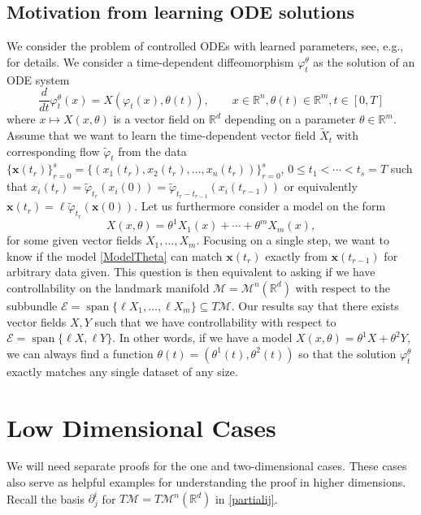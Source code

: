 \documentclass[10pt]{amsart}
\theoremstyle{remark}
\DeclareMathOperator{\spn}{span}
\newcommand{\E}{\mathcal{E}}
\newcommand{\LM}{\mathcal{M}}
\numberwithin{equation}{section}
\begin{document}
\subsection{Motivation from learning ODE solutions} \label{sec:NeuralODE}
We consider the problem of controlled ODEs with learned parameters, see, e.g., \cite{ChenNeurIPS,Ruiz-Balet,ALVAREZLOPEZ2024106640,ChengControl} for details. We consider a time-dependent diffeomorphism $\varphi_{t}^\theta$ as the solution of an ODE system
$$\frac{d}{dt} \varphi_t^\theta(x) = X(\varphi_t(x), \theta(t)), \qquad x \in \mathbb{R}^n, \theta(t) \in \mathbb{R}^m, t \in [0,T]$$
where $x\mapsto X(x,\theta)$ is a vector field on $\mathbb{R}^d$ depending on a parameter $\theta \in \mathbb{R}^m$. Assume that we want to learn the time-dependent vector field $\tilde X_t$ with corresponding flow $\tilde \varphi_t$ from the data $\{ \mathbf{x}(t_r)\}_{r=0}^s = \{ (x_{1}(t_r), x_{2}(t_r) ,\dots, x_{n}(t_r))\}_{r=0}^s$, $0 \leq t_1 < \cdots < t_s =T$ such that $x_{i}(t_r) = \tilde \varphi_{t_r}(x_{i}(0)) = \tilde \varphi_{t_r-t_{r-1}}(x_{i}(t_{r-1}))$ or equivalently $\mathbf{x}(t_r) = \ell \tilde \varphi_{t_r}(\mathbf{x}(0))$. Let us furthermore consider a model on the form
\begin{equation} \label{ModelTheta} X(x, \theta) = \theta^1 X_1(x) + \cdots + \theta^m X_m(x), \end{equation}
for some given vector fields $X_1, \dots, X_m$.
Focusing on a single step, we want to know if the model \eqref{ModelTheta} can match $\mathbf{x}(t_{r})$ exactly from $\mathbf{x}(t_{r-1})$ for arbitrary data given. This question is then equivalent to asking if we have controllability on the landmark manifold $\LM= \LM^n(\mathbb{R}^d)$ with respect to the subbundle $\E = \spn \{ \ell X_1, \dots, \ell X_m \} \subseteq T\LM$. Our results say that there exists vector fields $X, Y$ such that we have controllability with respect to $\E = \spn \{ \ell X, \ell Y \}$. In other words, if we have a model $X(x,\theta) = \theta^1 X + \theta^2 Y$, we can always find a function $\theta(t) = (\theta^1(t),\theta^2(t))$ so that the solution $\varphi_t^\theta$ exactly matches any single dataset of any size.







\section{Low Dimensional Cases}
We will need separate proofs for the one and two-dimensional cases. These cases also serve as helpful examples for understanding the proof in higher dimensions. Recall the basis $\partial_j^i$ for $T \LM = T\LM^n(\mathbb{R}^d)$ in \eqref{partialij}.
\end{document}
